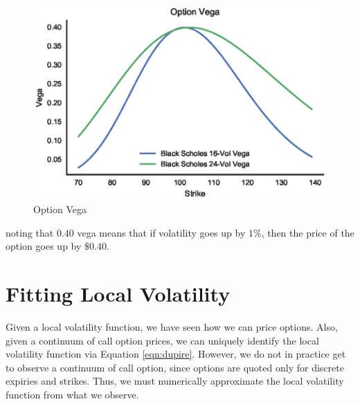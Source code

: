 \documentclass[11pt]{article}
\numberwithin{equation}{section}
\newcommand{\diff}[2]{\frac{\partial #1}{\partial #2}}
\begin{document}
\begin{figure}[h!]
\centering
\includegraphics{figs/vega.eps}
\caption{Option Vega}
\label{fig:vega}
\end{figure}

\noindent noting that $0.40$ vega means that if volatility goes up by $1\%$,
then the price of the option goes up by $\$0.40$. 


\section{Fitting Local Volatility}
\label{sec:localvolfitting}

% 

Given a local volatility function, we have seen how we can price options. Also,
given a continuum of call option prices, we can uniquely identify the local
volatility function via Equation \ref{eqn:dupire}. However, we do not in
practice get to observe a continuum of call option, since options are quoted
only for discrete expiries and strikes. Thus, we must numerically approximate
the local volatility function from what we observe.
\end{document}

